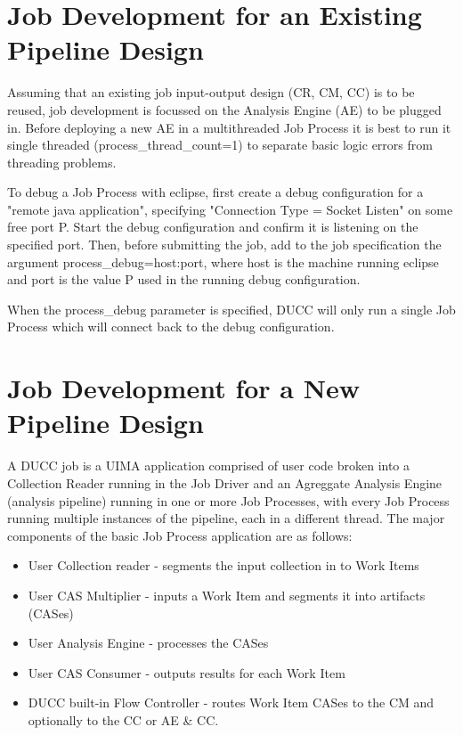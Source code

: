 \section{Job Development for an Existing Pipeline Design}

Assuming that an existing job input-output design (CR, CM, CC) is to be reused, job
development is focussed on the Analysis Engine (AE) to be plugged in. Before deploying a new
AE in a multithreaded Job Process it is best to run it single threaded
(process\_thread\_count=1) to separate basic logic errors from threading
problems.

To debug a Job Process with eclipse, first create a debug configuration for a
"remote java application", specifying "Connection Type = Socket Listen" on some
free port P. Start the debug configuration and confirm it is listening on the specified port.
Then, before submitting the job, add to the job specification the argument
process\_debug=host:port, where host is the machine running eclipse and port is
the value P used in the running debug configuration.

When the process\_debug parameter is specified, DUCC will only run a single Job Process
which will connect back to the debug configuration.


\section{Job Development for a New Pipeline Design}

A DUCC job is a UIMA application comprised of user code broken into a Collection
Reader running in the Job Driver and an Agreggate Analysis Engine (analysis pipeline) running in one 
or more Job Processes, with every Job Process running multiple instances of the pipeline, each in a different
thread. The major components of the basic Job Process application are as follows:

\begin{itemize}
  \item User Collection reader - segments the input collection in to Work Items
  \item User CAS Multiplier - inputs a Work Item and segments it into artifacts (CASes)
  \item User Analysis Engine - processes the CASes
  \item User CAS Consumer - outputs results for each Work Item
  \item DUCC built-in Flow Controller - routes Work Item CASes to the CM and optionally to the CC or AE \& CC.
\end{itemize}


